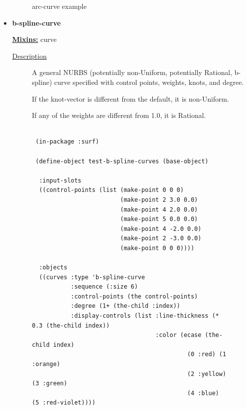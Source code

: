 \documentclass [11pt]{book}
\begin{document}
\begin{itemize}
\begin{figure}
\caption{arc-curve example}

\label{fig:arc-curve}

\end{figure}






\item {}
\label{prim:b-spline-curve}
\textbf{b-spline-curve}


\textbf{
\underline{Mixins:}} curve





\begin{description}

\item [
\underline{Description}]


A general NURBS (potentially non-Uniform, potentially Rational, b-spline) 
curve specified with control points, weights, knots, and degree.

If the knot-vector is different from the default, it is non-Uniform.

If any of the weights are different from 1.0, it is Rational.



\end{description}




\begin{figure}
\begin{lrbox}{\boxedverb}
\begin{minipage}{\linewidth}
{\small

\begin{verbatim}

 (in-package :surf)

 (define-object test-b-spline-curves (base-object)

  :input-slots
  ((control-points (list (make-point 0 0 0)
                         (make-point 2 3.0 0.0) 
                         (make-point 4 2.0 0.0) 
                         (make-point 5 0.0 0.0) 
                         (make-point 4 -2.0 0.0) 
                         (make-point 2 -3.0 0.0) 
                         (make-point 0 0 0))))
  
  :objects
  ((curves :type 'b-spline-curve
           :sequence (:size 6)
           :control-points (the control-points)
           :degree (1+ (the-child :index))
           :display-controls (list :line-thickness (* 0.3 (the-child index))
                                   :color (ecase (the-child index)
                                            (0 :red) (1 :orange) 
                                            (2 :yellow) (3 :green)
                                            (4 :blue) (5 :red-violet))))


\end{verbatim}}
\end{minipage}
\end{lrbox}
\end{figure}
\end{itemize}
\end{document}
